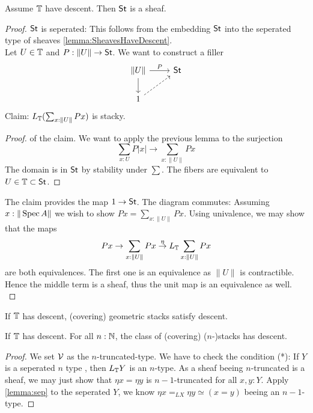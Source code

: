\begin{theorem}
	Assume $\mathbb{T}$ have descent. Then $\mathsf{St}$ is a sheaf.
\end{theorem}
\begin{proof}
	$\mathsf{St}$ is seperated: This follows from the embedding $\mathsf{St}$ into the seperated type of sheaves \ref{lemma:SheavesHaveDescent}. \\
	Let $U \in \mathbb{T}$ and $P : \|U\| \to \mathsf{St}$. We want to construct a filler 
	\[\begin{tikzcd}
		{\| U\|} & \St \\
		1
		\arrow["P", from=1-1, to=1-2]
		\arrow[from=1-1, to=2-1]
		\arrow[dashed, from=2-1, to=1-2]
	\end{tikzcd}\]
	Claim: $L_{\mathbb{T}} (\sum_{x: \|U\|} P x)$ is stacky.
	\begin{proof} of the claim. We want to apply the previous lemma to the surjection 
		\[\sum_{x : U} P | x | \to \sum_{x : \| U\|} P x \]
		The domain is in $\mathsf{St}$ by stability under $\sum$. The fibers are equivalent to $U \in \mathbb{T} \subset \mathsf{St}$.				
	\end{proof}
	The claim provides the map $1 \to \mathsf{St}$. The diagram commutes: Assuming $x : \|\operatorname{Spec} A\|$ we wish to show $P x = \sum_{x: \|U\|} P x$. Using univalence, we may show that the maps 
	\[P x \to \sum_{x: \|U\|} P x \overset{\eta}{\to} L_{\mathbb{T}} \sum_{x: \|U\|} P x\]
	are both equivalences.
	The first one is an equivalence as $\|U\|$ is contractible. Hence the middle term is a sheaf, thus the unit map is an equivalence as well. \\
	
	
	
\end{proof}
\begin{corollary}
	If $\mathbb{T}$ has descent, (covering) geometric stacks satisfy descent.
\end{corollary}

\begin{corollary}
	If $\mathbb{T}$ has descent. For all $n : \mathbb{N} $, the class of (covering) ($n$-)stacks has descent.
\end{corollary}
\begin{proof}
	We set $\mathcal{V}$ as the $n$-truncated-type. We have to check the condition (*):
	If $Y$ is a seperated $n$ type , then $L_{\mathbb{T}} Y$ is an $n$-type.
	As a sheaf beeing $n$-truncated is a sheaf, we may just show that $\eta x = \eta y$ is $n-1$-truncated for all $x , y : Y$.
	Apply \ref{lemma:sep} to the seperated $Y$, we know $\eta x =_{L X} \eta y \simeq (x=y) $ beeing an $n-1$-type.
	
\end{proof}

